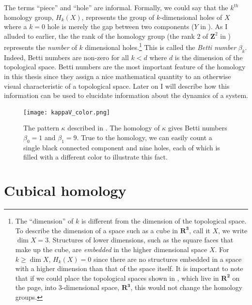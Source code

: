 The terms ``piece'' and ``hole'' are informal. Formally, we could say that the $k^{th}$ homology group, $H_k(X)$, represents the group of $k$-dimensional holes of $X$ where a $k = 0$ hole is merely the gap between two components (\eg $Y$ in ). As I alluded to earlier, the the rank of the homology group (\eg the rank $2$ of $\mathbf{Z}^2$ in ) represents the \emph{number} of $k$ dimensional holes.\footnote{The ``dimension'' of $k$ is different from the dimension of the topological space. To describe the dimension of a space such as a cube in $\mathbf{R^3}$, call it $X$, we write $\dim X = 3$. Structures of lower dimensions, such as the square faces that make up the cube, are \textit{embedded} in the higher dimensional space $X$. For $k \geq \dim X$, $H_k(X) = 0$ since there are no structures embedded in a space with a higher dimension than that of the space itself. It is important to note that if we could place the topological spaces shown in , which live in $\mathbf{R^2}$ on the page, into 3-dimensional space, $\mathbf{R^3}$, this would not change the homology groups.} This is called the \textit{Betti number} $\beta_k$. Indeed, Betti numbers are non-zero for all $k < d$ where $d$ is the dimension of the topological space. Betti numbers are the most important feature of the homology in this thesis since they assign a nice mathematical quantity to an otherwise visual characteristic of a topological space. Later on I will describe how this information can be used to elucidate information about the dynamics of a system.
%
\begin{figure}
	\centering
	\texttt{[image: kappaV\_color.png]}
	\caption{\label{fig:kappaV_color} The pattern $\kappa$ described in . The homology of $\kappa$ gives Betti numbers $\beta_0 = 1$ and $\beta_1 = 9$. True to the homology, we can easily count a single black connected component and nine holes, each of which is filled with a different color to illustrate this fact.}
\end{figure}

\section{Cubical homology} \label{ch2:cubicalhomology}

